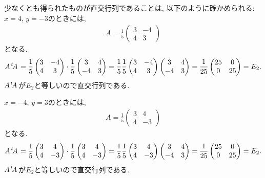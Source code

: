 \begin{checkanswer}%
  少なくとも得られたものが直交行列であることは,
  以下のように確かめられる:
  $x=4$,
  $y=-3$のときには,
  \begin{align*}
    A=\frac{1}{5}\begin{pmatrix}3&-4\\4&3\end{pmatrix}
  \end{align*}
  となる.
  \begin{align*}
    A{\left.^{t}\!A\right.}
    =\frac{1}{5}\begin{pmatrix}3&-4\\4&3\end{pmatrix}
    \cdot\frac{1}{5}\begin{pmatrix}3&4\\-4&3\end{pmatrix}  
    =\frac{1}{5}\frac{1}{5}\begin{pmatrix}3&-4\\4&3\end{pmatrix}\begin{pmatrix}3&4\\-4&3\end{pmatrix}  
        =\frac{1}{25}\begin{pmatrix}25&0\\0&25\end{pmatrix}
        =E_2.
  \end{align*}
  $A{\left.^{t}\!A\right.}$が$E_2$と等しいので直交行列である.
  
  $x=-4$,
  $y=3$のときには,
  \begin{align*}
    A=\frac{1}{5}\begin{pmatrix}3&4\\4&-3\end{pmatrix}
  \end{align*}
  となる.
  \begin{align*}
    A{\left.^{t}\!A\right.}
    =\frac{1}{5}\begin{pmatrix}3&4\\4&-3\end{pmatrix}
    \cdot\frac{1}{5}\begin{pmatrix}3&4\\4&-3\end{pmatrix}  
    =\frac{1}{5}\frac{1}{5}\begin{pmatrix}3&4\\4&-3\end{pmatrix}\begin{pmatrix}3&4\\-4&3\end{pmatrix}  
        =\frac{1}{25}\begin{pmatrix}25&0\\0&25\end{pmatrix}
        =E_2.
  \end{align*}
  $A{\left.^{t}\!A\right.}$が$E_2$と等しいので直交行列である.
\end{checkanswer}
